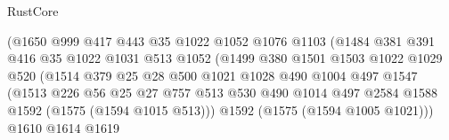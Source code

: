 \begin{lexlean}{RustCore}
\begin{coremodule}
                                  (@1650
                                    @999
                                    @417
                                    @443
                                    @35
                                    @1022
                                    @1052
                                    @1076
                                    @1103
                                    (@1484
                                      @381
                                      @391
                                      @416
                                      @35
                                      @1022
                                      @1031
                                      @513
                                      @1052
                                      (@1499
                                        @380
                                        @1501
                                        @1503
                                        @1022
                                        @1029
                                        @520
                                        (@1514
                                          @379
                                          @25
                                          @28
                                          @500
                                          @1021
                                          @1028
                                          @490
                                          @1004
                                          @497
                                          @1547
                                          (@1513
                                            @226
                                            @56
                                            @25
                                            @27
                                            @757
                                            @513
                                            @530
                                            @490
                                            @1014
                                            @497
                                            @2584
                                            @1588
                                            @1592
                                            (@1575 (@1594 @1015 @513)))
                                          @1592
                                          (@1575 (@1594 @1005 @1021)))
                                        @1610
                                        @1614
                                        @1619

\end{coremodule}
\end{lexlean}
